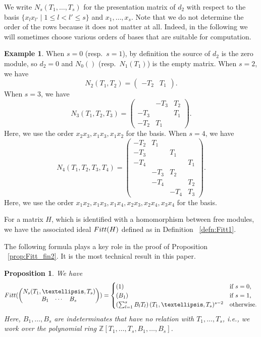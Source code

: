 \documentclass[11pt]{article}
\newtheorem{prop}[theo]{Proposition}
\theoremstyle{definition}
\newtheorem{exam}[theo]{Example}
\numberwithin{equation}{section}
\newcommand{\Z}{\mathbb{Z}}
\newcommand{\Fitt}{{\rm Fitt}}
\begin{document}
We write $N_s(T_1, \dots, T_s)$ for the presentation matrix of $d_2$ with respect to the basis $\{x_l x_{l'} \mid 1 \leq l < l' \leq s \}$ and $x_1, \dots, x_s$.
Note that we do not determine the order of the rows because it does not matter at all.
Indeed, in the following we will sometimes choose various orders of bases that are suitable for computation.

\begin{exam}
When $s = 0$ (resp.~$s = 1$), by definition the source of $d_2$ is the zero module, so $d_2 = 0$ and $N_0()$ (resp.~$N_1(T_1)$) is the empty matrix.
When $s = 2$, we have 
\[
N_2(T_1, T_2) = \begin{pmatrix} -T_2 & T_1 \end{pmatrix}.
\]
When $s = 3$, we have
\[
N_3(T_1, T_2, T_3) = 
\begin{pmatrix}
& - T_3 & T_2\\
- T_3 & & T_1\\
- T_2 & T_1 &
\end{pmatrix}.
\]
Here, we use the order $x_2x_3, x_1x_3, x_1x_2$ for the basis.
When $s = 4$, we have
\[
N_4(T_1, T_2, T_3, T_4) = 
\begin{pmatrix}
-T_2 & T_1 &  & \\
- T_3 & & T_1 & \\
- T_4 & & & T_1\\
& - T_3 & T_2 & \\
& -T_4 & & T_2\\
& & -T_4 & T_3
\end{pmatrix}.
\]
Here, we use the order $x_1 x_2, x_1x_3, x_1x_4, x_2x_3, x_2x_4, x_3x_4$ for the basis.
\end{exam}

For a matrix $H$, which is identified with a homomorphism between free modules, we have the associated ideal $\Fitt(H)$ defined as in Definition ~\ref{defn:Fitt1}.

The following formula plays a key role in the proof of Proposition ~\ref{prop:Fitt_fin2}.
It is the most technical result in this paper.

\begin{prop}\label{prop:Fitt_p2}
We have
\[
\Fitt(\begin{pmatrix} N_s(T_1, \dots, T_s) \\ \begin{matrix} B_1 & \cdots & B_s \end{matrix} \end{pmatrix})
= \begin{cases}
(1) & \text{if $s = 0$,}\\
(B_1) & \text{if $s = 1$,}\\
\left( \sum_{l=1}^s B_l T_l \right)(T_1, \dots, T_s)^{s - 2} & \text{otherwise.}
\end{cases}
\]
Here, $B_1, \dots, B_s$ are indeterminates that have no relation with $T_1, \dots, T_s$, i.e., we work over the polynomial ring $\Z[T_1, \dots, T_s, B_1, \dots, B_s]$.
\end{prop}
\end{document}
